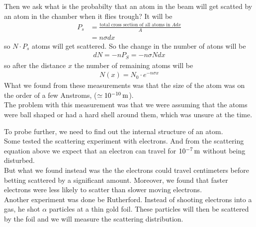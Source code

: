 Then we ask what is the probabilty that an atom in the beam will get scatted by an atom in the chamber when it flies trough? It will be
\begin{align*}
	P_s &= \frac{\text{total cross section of all atoms in $A dx$}}{A}\\
			&= n \sigma dx
\end{align*}
so $N \cdot P_s$ atoms will get scattered. So the change in the number of atons will be
\begin{align*}
	dN = -nP_S = - n \sigma N dx
\end{align*}
so after the distance $x$ the number of remaining atoms will be
\begin{align*}
	N(x) = N_0 \cdot e^{-n \sigma x}
\end{align*}
What we found from these measurements was that the size of the atom was on the order of a few Anstroms, ($\simeq 10^{-10}\meter$).\\

The problem with this measurement was that we were assuming that the atoms were ball shaped or had a hard shell around them, which was unsure at the time.

To probe further, we need to find out the internal structure of an atom.\\
Some tested the scattering experiment with electrons. And from the scattering equation above we expect that an electron can travel for $10^{-7}\meter$ without being disturbed.\\
But what we found instead was the the electrons could travel centimeters before betting scattered by a significant amount. Moreover, we found that faster electrons were less likely to scatter than slower moving electrons.\\

Another experiment was done be Rutherford. Instead of shooting electrons into a gas, he shot $\alpha$ particles at a thin gold foil. These particles will then be scattered by the foil and we will measure the scattering distribution.

